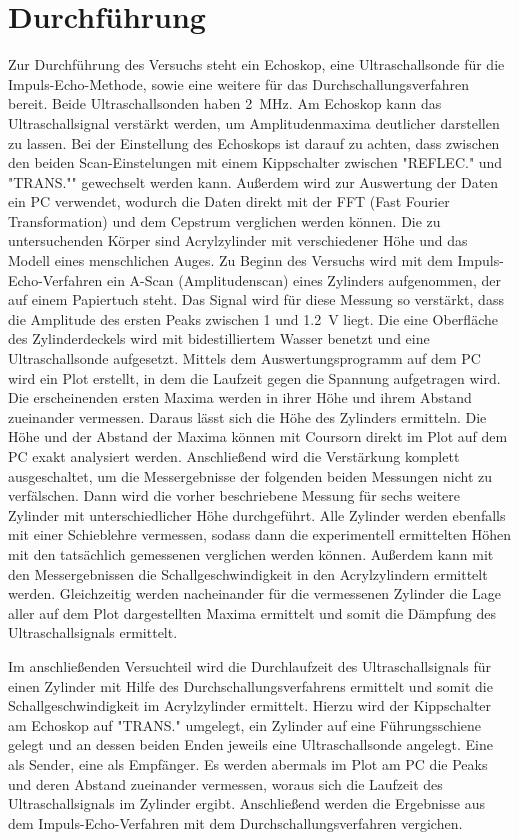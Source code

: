 \section{Durchführung}
Zur Durchführung des Versuchs steht ein Echoskop, eine Ultraschallsonde für die Impuls-Echo-Methode, sowie eine weitere
für das Durchschallungsverfahren bereit. Beide Ultraschallsonden haben \SI{2}{\mega \hertz}.
Am Echoskop kann das Ultraschallsignal verstärkt werden, um Amplitudenmaxima
deutlicher darstellen zu lassen. Bei der Einstellung des Echoskops ist darauf zu achten, dass zwischen den beiden Scan-Einstelungen
mit einem Kippschalter zwischen "REFLEC." und "TRANS."" gewechselt werden kann.
Außerdem wird zur Auswertung der Daten ein PC verwendet, wodurch die Daten direkt
mit der FFT (Fast Fourier Transformation) und dem Cepstrum verglichen werden können.
Die zu untersuchenden Körper sind Acrylzylinder mit verschiedener Höhe und das Modell eines menschlichen Auges.
Zu Beginn des Versuchs wird mit dem Impuls-Echo-Verfahren ein A-Scan (Amplitudenscan) eines Zylinders aufgenommen, der auf einem
Papiertuch steht. Das Signal wird für diese Messung so verstärkt, dass die Amplitude des ersten Peaks zwischen 1 und \SI{1,2}{\volt} liegt.
Die eine Oberfläche des Zylinderdeckels wird mit bidestilliertem Wasser benetzt und eine Ultraschallsonde aufgesetzt. Mittels
dem Auswertungsprogramm auf dem PC wird ein Plot erstellt, in dem die Laufzeit gegen die Spannung aufgetragen
wird. Die erscheinenden ersten Maxima werden in ihrer Höhe und ihrem Abstand zueinander vermessen. Daraus lässt sich
die Höhe des Zylinders ermitteln. Die Höhe und der Abstand der Maxima können mit Coursorn direkt im Plot auf dem PC exakt
analysiert werden.
Anschließend wird die Verstärkung komplett ausgeschaltet, um die Messergebnisse der folgenden beiden Messungen nicht zu verfälschen.
Dann wird die vorher beschriebene Messung für sechs weitere Zylinder mit unterschiedlicher Höhe durchgeführt.
Alle Zylinder werden ebenfalls mit einer Schieblehre vermessen, sodass dann die experimentell ermittelten Höhen mit den tatsächlich
gemessenen verglichen werden können. Außerdem kann mit den Messergebnissen die Schallgeschwindigkeit in den Acrylzylindern ermittelt werden.
Gleichzeitig werden nacheinander für die vermessenen Zylinder die Lage aller auf dem Plot dargestellten Maxima
ermittelt und somit die Dämpfung des Ultraschallsignals ermittelt.

\noindent Im anschließenden Versuchteil wird die Durchlaufzeit des Ultraschallsignals für einen Zylinder mit Hilfe des Durchschallungsverfahrens
ermittelt und somit die Schallgeschwindigkeit im Acrylzylinder ermittelt.
Hierzu wird der Kippschalter am Echoskop auf "TRANS." umgelegt, ein Zylinder auf eine Führungsschiene gelegt und an dessen
beiden Enden jeweils eine Ultraschallsonde angelegt. Eine als Sender, eine als Empfänger.
Es werden abermals im Plot am PC die Peaks und deren Abstand zueinander vermessen, woraus sich die Laufzeit des Ultraschallsignals im Zylinder
ergibt.
Anschließend werden die Ergebnisse aus dem Impuls-Echo-Verfahren mit dem Durchschallungsverfahren vergichen.

